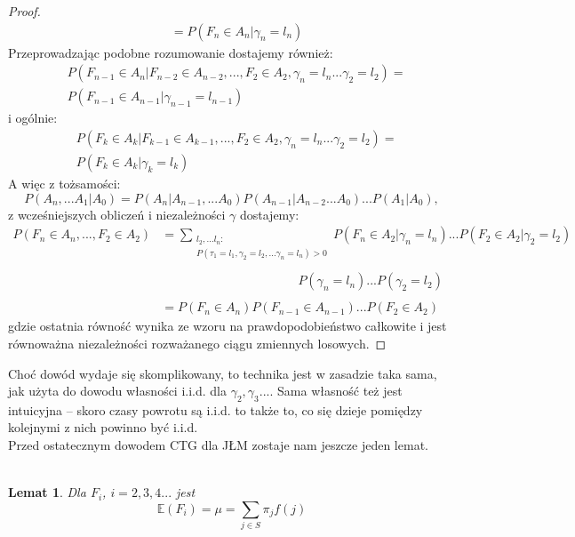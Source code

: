 \documentclass[a4paper]{article}
\theoremstyle{defn}
\theoremstyle{theorem}
\theoremstyle{lemma}
\newtheorem{lemma}[defn]{Lemat}
\theoremstyle{cor}
\theoremstyle{fact}
\begin{document}
\begin{proof}
\begin{align*}
    &= P(F_n \in A_n | \gamma_n = l_n)
\end{align*}
Przeprowadzając podobne rozumowanie dostajemy również:
\begin{align*}
&P(F_{n-1} \in A_n|F_{n-2} \in A_{n-2},  ..., F_2 \in A_2, \gamma_n = l_n ... \gamma_2 = l_2) =\\ & P(F_{n-1} \in A_{n-1} | \gamma_{n-1} = l_{n-1})
\end{align*}
i ogólnie:
\begin{align*}
&P(F_{k} \in A_k|F_{k-1} \in A_{k-1},  ..., F_2 \in A_2, \gamma_n = l_n ... \gamma_2 = l_2) =\\ & P(F_{k} \in A_{k} | \gamma_{k} = l_{k})
\end{align*}
A więc z tożsamości:
$$P(A_n, ... A_1|A_0) = P(A_n|A_{n-1}, ...A_0)P(A_{n-1}|A_{n-2}...A_0)...P(A_1|A_0),$$
z wcześniejszych obliczeń i niezależności $\gamma$ dostajemy:
\begin{align*}
    P(F_n \in A_n, ..., F_2 \in A_2) &= \sum\limits_{\substack{l_2, ... l_n:\\P(\tau_1 = l_1, \gamma_2 = l_2, ... \gamma_n = l_n) > 0}} P(F_n \in A_2|\gamma_n = l_n) ... P(F_2 \in A_2|\gamma_2 = l_2)\\\\
    &\quad\quad\quad\quad\quad\quad\quad\quad\quad\quad\quad P(\gamma_n = l_n) ... P(\gamma_2 = l_2)\\\\
    &= P(F_n \in A_n)P(F_{n-1} \in A_{n-1}) ... P(F_2 \in A_2)
\end{align*}
gdzie ostatnia równość wynika ze wzoru na prawdopodobieństwo całkowite i jest równoważna niezależności rozważanego ciągu zmiennych losowych.
\end{proof}
Choć dowód wydaje się skomplikowany, to technika jest w zasadzie taka sama, jak użyta do dowodu własności i.i.d. dla $\gamma_2, \gamma_3 ...$. Sama własność też jest intuicyjna – skoro czasy powrotu są i.i.d. to także to, co się dzieje pomiędzy kolejnymi z nich powinno być i.i.d.\\
Przed ostatecznym dowodem CTG dla JŁM zostaje nam jeszcze jeden lemat.\\
\\
\begin{lemma}\label{lemma2.6.4}
Dla $F_i$, $i=2,3,4...$ jest
$$\mathbb{E}(F_i) = \mu = \sum\limits_{j \in S} \pi_j f(j)$$
\end{lemma}
\end{document}
